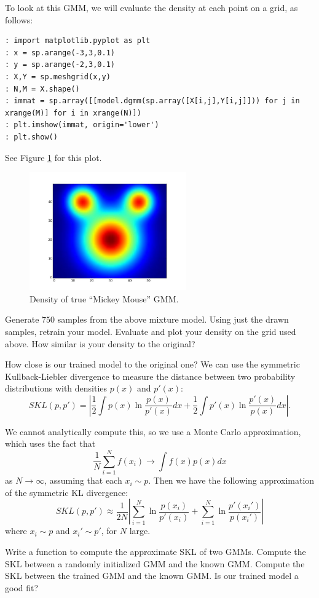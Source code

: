 To look at this GMM, we will evaluate the density at each point on a grid, as follows:

\begin{lstlisting}[style=python]
: import matplotlib.pyplot as plt
: x = sp.arange(-3,3,0.1)
: y = sp.arange(-2,3,0.1)
: X,Y = sp.meshgrid(x,y)
: N,M = X.shape()
: immat = sp.array([[model.dgmm(sp.array([X[i,j],Y[i,j]])) for j in xrange(M)] for i in xrange(N)])
: plt.imshow(immat, origin='lower')
: plt.show()
\end{lstlisting}

See Figure \ref{mickeygmm} for this plot.

\begin{figure}[h]
\centering
\includegraphics[height=2in]{truemickeygmm.jpeg}
\caption{Density of true ``Mickey Mouse'' GMM.}\label{mickeygmm}
\end{figure}

\begin{problem}
Generate $750$ samples from the above mixture model. Using just the drawn samples, retrain your model. Evaluate and plot your density on the grid used above. How similar is your density to the original?
\end{problem}

How close is our trained model to the original one? We can use the symmetric Kullback-Liebler divergence to measure the distance between two probability distributions with densities $p(x)$ and $p'(x)$:
$$SKL(p,p') = |\frac{1}{2} \int p(x) \ln \frac{p(x)}{p'(x)} dx + \frac{1}{2} \int p'(x) \ln \frac{p'(x)}{p(x)} dx |.$$

We cannot analytically compute this, so we use a Monte Carlo approximation, which uses the fact that $$\frac{1}{N} \sum_{i=1}^{N} f(x_{i}) \rightarrow \int f(x) p(x) dx$$ as $N \rightarrow \infty$, assuming that each $x_{i} \sim p$. Then we have the following approximation of the symmetric KL divergence:
$$SKL(p,p') \approx \frac{1}{2N} \left\vert \sum_{i=1}^{N} \ln \frac{p(x_{i})}{p'(x_{i})} + \sum_{i=1}^{N} \ln \frac{p'(x_{i}')}{p(x_{i}')} \right\vert$$ where $x_{i} \sim p$ and $x_{i}' \sim p'$, for $N$ large.

\begin{problem}
Write a function to compute the approximate SKL of two GMMs. Compute the SKL between a randomly initialized GMM and the known GMM. Compute the SKL between the trained GMM and the known GMM. Is our trained model a good fit?
\end{problem}